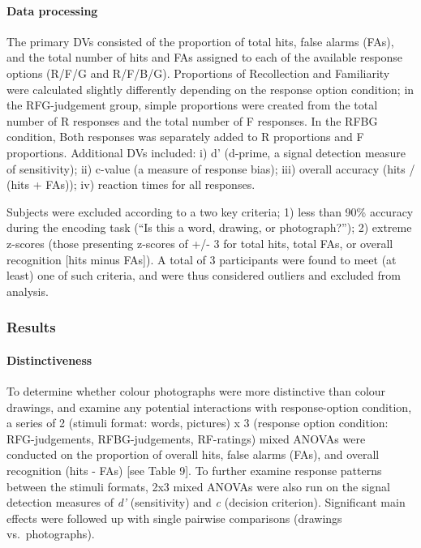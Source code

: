 \documentclass[
  11pt,
]{article}
\begin{document}
\hypertarget{data-processing-3}{%
\paragraph{Data processing}\label{data-processing-3}}

The primary DVs consisted of the proportion of total hits, false alarms
(FAs), and the total number of hits and FAs assigned to each of the
available response options (R/F/G and R/F/B/G). Proportions of
Recollection and Familiarity were calculated slightly differently
depending on the response option condition; in the RFG-judgement group,
simple proportions were created from the total number of R responses and
the total number of F responses. In the RFBG condition, Both responses
was separately added to R proportions and F proportions. Additional DVs
included: i) d' (d-prime, a signal detection measure of sensitivity);
ii) c-value (a measure of response bias); iii) overall accuracy (hits /
(hits + FAs)); iv) reaction times for all responses.

Subjects were excluded according to a two key criteria; 1) less than
90\% accuracy during the encoding task (``Is this a word, drawing, or
photograph?''); 2) extreme z-scores (those presenting z-scores of +/- 3
for total hits, total FAs, or overall recognition {[}hits minus FAs{]}).
A total of 3 participants were found to meet (at least) one of such
criteria, and were thus considered outliers and excluded from analysis.

\newpage

\hypertarget{results-3}{%
\subsubsection{Results}\label{results-3}}

\hypertarget{distinctiveness}{%
\paragraph{Distinctiveness}\label{distinctiveness}}

To determine whether colour photographs were more distinctive than
colour drawings, and examine any potential interactions with
response-option condition, a series of 2 (stimuli format: words,
pictures) x 3 (response option condition: RFG-judgements,
RFBG-judgements, RF-ratings) mixed ANOVAs were conducted on the
proportion of overall hits, false alarms (FAs), and overall recognition
(hits - FAs) {[}see Table 9{]}. To further examine response patterns
between the stimuli formats, 2x3 mixed ANOVAs were also run on the
signal detection measures of \emph{d'} (sensitivity) and \emph{c}
(decision criterion). Significant main effects were followed up with
single pairwise comparisons (drawings vs.~photographs).
\end{document}
